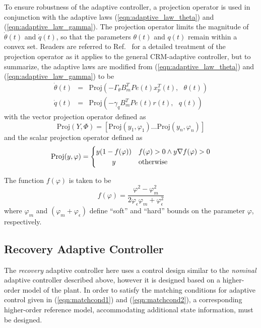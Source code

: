 To ensure robustness of the adaptive controller, a projection operator \cite{pomet1992adaptive, lavretsky2011projection} is used in conjunction with the adaptive laws (\ref{eqn:adaptive_law_theta}) and (\ref{eqn:adaptive_law_gamma}). The projection operator limits the magnitude of $\dot{\theta}(t)$ and $\dot{q}(t)$, so that the parameters $\theta(t)$ and $q(t)$ remain within a convex set. Readers are referred to Ref.~\cite{gibson2013adaptive} for a detailed treatment of the projection operator as it applies to the general CRM-adaptive controller, but to summarize, the adaptive laws are modified from (\ref{eqn:adaptive_law_theta}) and (\ref{eqn:adaptive_law_gamma}) to be
\begin{eqnarray}
	\dot{\theta}(t) &=& \text{Proj}(- \Gamma_\theta B_m^T P e(t) x_p^T(t),\text{ } \theta(t)) \label{eqn:thetadot_projection} \\
	\dot{q}(t) &=& \text{Proj}(- \gamma_q B_m^T P e(t) r(t),\text{ } q(t)) \label{eqn:qdot_projection}
\end{eqnarray}
\noindent with the vector projection operator defined as
\begin{equation}
	\text{Proj}(Y, \Phi) = \left[ \text{Proj}(y_1, \varphi_1) \ldots \text{Proj}(y_n, \varphi_n) \right]
\end{equation}
\noindent and the scalar projection operator defined as
\begin{equation} %
	\text{Proj}(y, \varphi) = \begin{cases}
		y(1 - f(\varphi)) & f(\varphi) > 0 \land y \nabla f(\varphi) > 0\\
		\hfil y & \text{otherwise}
	\end{cases}
\end{equation}

\noindent The function $f(\varphi)$ is taken to be
\begin{equation}
	f(\varphi) = \frac{\varphi^2 - \varphi_{m}^2}{2 \varphi_{\epsilon} \varphi_{m} + \varphi_{\epsilon}^2}
	\label{eqn:proj_function}
\end{equation}
\noindent where $\varphi_{m}$ and $(\varphi_{m} + \varphi_{\epsilon})$ define ``soft'' and ``hard'' bounds on the parameter $\varphi$, respectively.

\subsection{Recovery Adaptive Controller}
The \textit{recovery} adaptive controller here uses a control design similar to the \textit{nominal} adaptive controller described above, however it is designed based on a higher-order model of the plant. In order to satisfy the matching conditions for adaptive control given in (\ref{eqn:matchcond1}) and (\ref{eqn:matchcond2}), a corresponding higher-order reference model, accommodating additional state information, must be designed.

